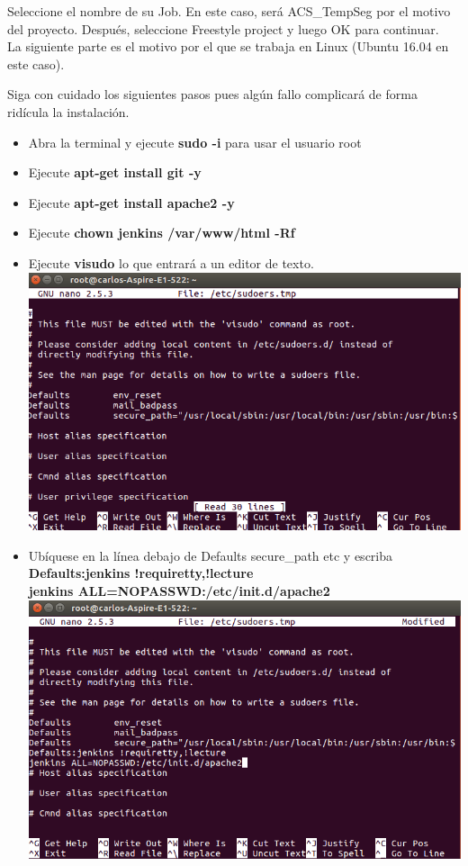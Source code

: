 \documentclass[a4paper]{article}
\newcommand\tab[1][0.55cm]{\hspace*{#1}}
\begin{document}
{\tab Seleccione el nombre de su Job. En este caso, será ACS\_TempSeg por el motivo del proyecto. Después, seleccione Freestyle project y luego OK para continuar. \\

La siguiente parte es el motivo por el que se trabaja en Linux (Ubuntu 16.04 en este caso). 

Siga con cuidado los siguientes pasos pues algún fallo complicará de forma ridícula la instalación. 

	\begin{itemize}
    
    \item Abra la terminal y ejecute \textbf{sudo -i} para usar el usuario root
    \item Ejecute \textbf{apt-get install git -y}
    \item Ejecute \textbf{apt-get install apache2 -y}
    \item Ejecute \textbf{chown jenkins /var/www/html -Rf}
    \newpage
    \item Ejecute \textbf{visudo} lo que entrará a un editor de texto. \\
    	\includegraphics[scale=0.5]{visudo}
    \item Ubíquese en la línea debajo de Defaults secure\_path etc y escriba\\ \textbf{Defaults:jenkins !requiretty,!lecture}\\
\textbf{jenkins ALL=NOPASSWD:/etc/init.d/apache2}\\
    \includegraphics[scale=0.5]{visudo2}\\

\end{itemize}}
\end{document}
